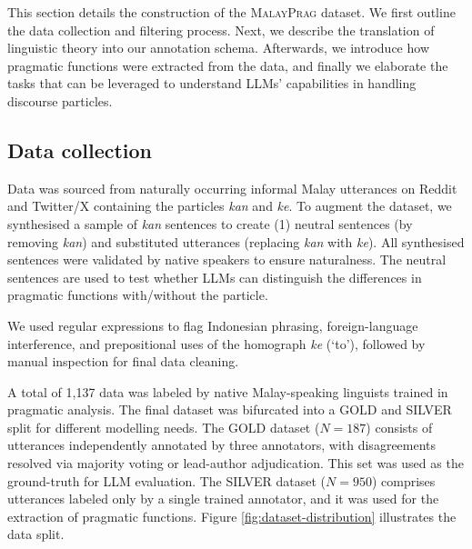\documentclass[11pt]{article}
\begin{document}
This section details the construction of the \textsc{MalayPrag} dataset. We first outline the data collection and filtering process. Next, we describe the translation of linguistic theory into our annotation schema. Afterwards, we introduce how pragmatic functions were extracted from the data, and 
finally we elaborate the tasks that can be leveraged to understand LLMs' capabilities in handling discourse particles.

\subsection{Data collection}
 Data was sourced from naturally occurring informal Malay utterances on Reddit and Twitter/X containing the particles \textit{kan} and \textit{ke}. To augment the dataset, we synthesised a sample of \textit{kan} sentences to create (1) neutral sentences (by removing \textit{kan}) and substituted utterances (replacing \textit{kan} with \textit{ke}). All synthesised sentences were validated by native speakers to ensure naturalness. The neutral sentences are used to test whether LLMs can distinguish the differences in pragmatic functions with/without the particle.

We used regular expressions to flag Indonesian phrasing, foreign-language interference, and prepositional uses of the homograph \textit{ke} (`to'), followed by manual inspection for final data cleaning.

A total of 1{,}137 data was labeled by native Malay-speaking linguists trained in pragmatic analysis. The final dataset was bifurcated into a GOLD and SILVER split for different modelling needs. The GOLD dataset ($N=187$) consists of utterances independently annotated by three annotators, with disagreements resolved via majority voting or lead-author adjudication. This set was used as the ground-truth for LLM evaluation. The SILVER dataset ($N=950$) comprises utterances labeled only by a single trained annotator, and it was used for the extraction of pragmatic functions. Figure \ref{fig:dataset-distribution} illustrates the data split.
\end{document}
